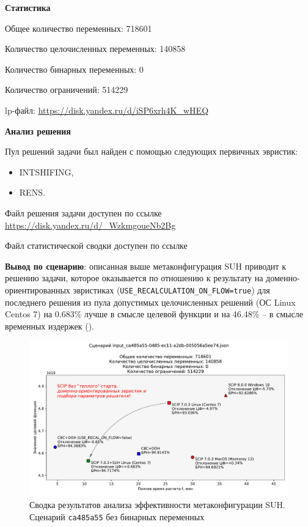 \documentclass[%
	11pt,
	a4paper,
	utf8,
		]{article}
\begin{document}
\textbf{Статистика}\vspace*{1mm}

Общее количество переменных: 718601

Количество целочисленных переменных: 140858

Количество бинарных переменных: 0

Количество ограничений: 514229

lp-файл: \url{https://disk.yandex.ru/d/iSP6xrh4K_wHEQ}

\vspace*{5mm}\textbf{Анализ решения}\vspace*{1mm}

Пул решений задачи был найден с помощью следующих первичных эвристик:
\begin{itemize}
	\item INTSHIFING,
	
	\item RENS.
\end{itemize}

Файл решения задачи доступен по ссылке \url{https://disk.yandex.ru/d/_WzkmgoueNb2Bg}

Файл статистической сводки доступен по ссылке \url{}

\vspace*{3mm}
\textbf{Вывод по сценарию}: описанная выше метаконфигурация SUH приводит к решению задачи, которое оказывается по отношению к результату на доменно-ориентированных эвристиках (\verb|USE_RECALCULATION_ON_FLOW=true|) для последнего решения из пула допустимых целочисленных решений (ОС Linux Centos 7) на 0.683\% лучше в смысле целевой функции и на 46.48\% -- в смысле временных издержек ().

\begin{figure}[!h]
	\centering
	\includegraphics[scale=0.6]{figures/summary_ca485a55.pdf}
	\caption{Сводка результатов анализа эффективности метаконфигурации SUH. \\Сценарий \texttt{ca485a55} без бинарных переменных}\label{fig:summary_ca485a55}
\end{figure}
\end{document}
